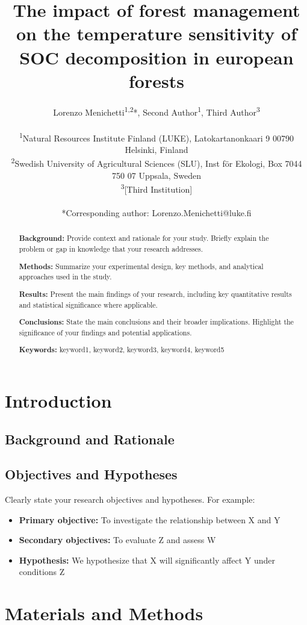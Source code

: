 \documentclass[12pt,a4paper]{article}
\title{\textbf{The impact of forest management on the temperature sensitivity of SOC decomposition in european forests}}
\author{
    Lorenzo Menichetti\textsuperscript{1,2}*, 
    Second Author\textsuperscript{1}, 
    Third Author\textsuperscript{3}\\
    \\
    \textsuperscript{1}Natural Resources Institute Finland (LUKE), Latokartanonkaari 9 00790 Helsinki, Finland\\
    \textsuperscript{2}Swedish University of Agricultural Sciences (SLU), Inst för Ekologi, Box 7044 750 07 Uppsala, Sweden\\
    \textsuperscript{3}[Third Institution]\\
    \\
    *Corresponding author: Lorenzo.Menichetti@luke.fi
}
\date{}
\begin{document}
\maketitle

\begin{abstract}
\noindent
\textbf{Background:} Provide context and rationale for your study. Briefly explain the problem or gap in knowledge that your research addresses.

\textbf{Methods:} Summarize your experimental design, key methods, and analytical approaches used in the study.

\textbf{Results:} Present the main findings of your research, including key quantitative results and statistical significance where applicable.

\textbf{Conclusions:} State the main conclusions and their broader implications. Highlight the significance of your findings and potential applications.

\textbf{Keywords:} keyword1, keyword2, keyword3, keyword4, keyword5
\end{abstract}

\newpage

\section{Introduction}


\subsection{Background and Rationale}


\subsection{Objectives and Hypotheses}

Clearly state your research objectives and hypotheses. For example:
\begin{itemize}
    \item \textbf{Primary objective:} To investigate the relationship between X and Y
    \item \textbf{Secondary objectives:} To evaluate Z and assess W
    \item \textbf{Hypothesis:} We hypothesize that X will significantly affect Y under conditions Z
\end{itemize}






\section{Materials and Methods}
\end{document}
